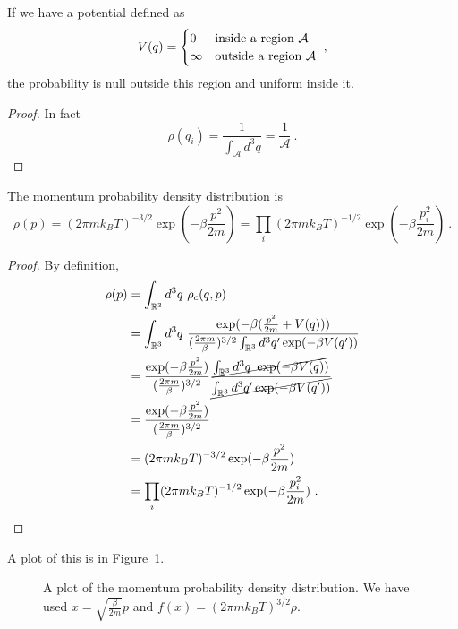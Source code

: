     If we have a potential defined as 
    \begin{equation*}
        V (q) = \begin{cases}
            0 & \textnormal{inside a region } \mathcal A\\
            \infty & \textnormal{outside a region } \mathcal A\\
        \end{cases} ~,
    \end{equation*}
    the probability is null outside this region and uniform inside it. 
    \begin{proof}
        In fact 
        \begin{equation*}
            \rho(q_i) = \frac{1}{\int_{\mathcal A} d^3 q} = \frac{1}{\mathcal A} ~. 
        \end{equation*}
    \end{proof}

    The momentum probability density distribution is 
    \begin{equation*}
        \rho(p) = (2\pi m k_B T)^{-3/2} \exp(- \beta \frac{p^2}{2m}) = \prod_i (2\pi m k_B T)^{-1/2} \exp(- \beta \frac{p^2_i}{2m}) ~.
    \end{equation*}
    \begin{proof}
        By definition, 
        \begin{equation*}
        \begin{aligned}
            \rho(p) & = \int_{\mathbb R^3} d^3 q ~ \rho_c (q, p) \\ & = \int_{\mathbb R^3} d^3 q ~ \frac{\exp (- \beta ( \frac{p^2}{2m} + V(q) ))}{(\frac{2\pi m}{\beta})^{3/2} \int_{\mathbb R^3} d^3 q' \exp(- \beta V(q'))} \\ & = \frac{\exp(- \beta \frac{p^2}{2m})}{(\frac{2\pi m}{\beta})^{3/2}} \frac{\cancel{\int_{\mathbb R^3} d^3 q ~ \exp (- \beta V(q) )}}{\cancel{\int_{\mathbb R^3} d^3 q' \exp(- \beta V(q'))}} \\ & = \frac{\exp(- \beta \frac{p^2}{2m})}{(\frac{2\pi m}{\beta})^{3/2}} \\ & = (2\pi m k_B T)^{-3/2} \exp(- \beta \frac{p^2}{2m}) \\ & = \prod_i (2\pi m k_B T)^{-1/2} \exp(- \beta \frac{p^2_i}{2m}) ~.
        \end{aligned}
        \end{equation*}
    \end{proof}
    A plot of this is in Figure~\ref{max:mom}.
    \begin{figure}
        \centering
        \caption{A plot of the momentum probability density distribution. We have used $x = \sqrt{\frac{\beta}{2m}} p$ and $f(x) = (2\pi m k_B T)^{3/2} \rho$.}
        \label{max:mom}
    \end{figure}
    

